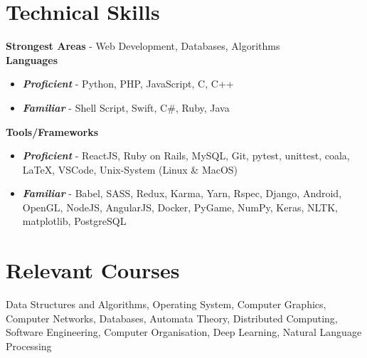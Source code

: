 \documentclass[margin, centered]{res}
\begin{document}
\begin{resume}
        \section{Technical \hspace{2mm} Skills}
            \textbf{Strongest Areas} - Web Development, Databases, Algorithms \\
            \textbf{Languages}
            \begin{itemize}
                \item \textbf{\textsl{Proficient}} - Python, PHP, JavaScript, C, C++
                \item \textbf{\textsl{Familiar}} - Shell Script, Swift, C\#, Ruby, Java
            \end{itemize}
            \textbf{Tools/Frameworks}
            \begin{itemize}
                \item \textbf{\textsl{Proficient}} - ReactJS, Ruby on Rails, MySQL, Git, pytest, unittest, coala, \LaTeX, VSCode, Unix-System (Linux \& MacOS)
                \item \textbf{\textsl{Familiar}} - Babel, SASS, Redux, Karma, Yarn, Rspec, Django, Android, OpenGL, NodeJS, AngularJS, Docker, PyGame, NumPy, Keras, NLTK, matplotlib, PostgreSQL
            \end{itemize}

        \section{Relevant \hspace{2mm} Courses}
            Data Structures and Algorithms, Operating System, Computer Graphics, Computer Networks,
            Databases, Automata Theory, Distributed Computing, Software Engineering, Computer Organisation, Deep Learning, Natural Language Processing


\end{resume}
\end{document}
